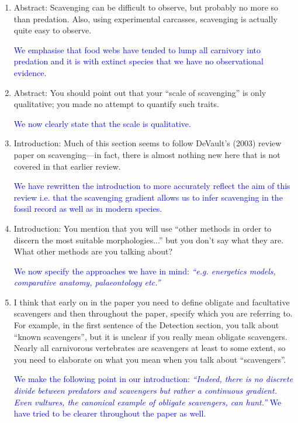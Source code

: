 \documentclass[12pt,letterpaper]{article}
\begin{document}
\begin{enumerate}
\item{Abstract: Scavenging can be difficult to observe, but probably no more so than predation.
Also, using experimental carcasses, scavenging is actually quite easy to observe.}

\textcolor{blue}{We emphasise that food webs have tended to lump all carnivory into predation and it is with extinct species that we have no observational evidence.} 

\item{Abstract: You should point out that your ``scale of scavenging'' is only qualitative; you made no attempt to quantify such traits.}

\textcolor{blue}{We now clearly state that the scale is qualitative.} 

\item{Introduction: Much of this section seems to follow DeVault's (2003) review paper on scavenging—in fact, there is almost nothing new here that is not covered in that earlier review.}

\textcolor{blue}{We have rewritten the introduction to more accurately reflect the aim of this review i.e. that the scavenging gradient allows us to infer scavenging in the fossil record as well as in modern species.} %

\item{Introduction: You mention that you will use ``other methods in order to discern the most suitable morphologies...''  but you don't say what they are. What other methods are you talking about?}

\textcolor{blue}{We now specify the approaches we have in mind:  \textit{``e.g. energetics models, comparative anatomy, palaeontology etc.'' }}

\item{I think that early on in the paper you need to define obligate and facultative scavengers and then throughout the paper, specify which you are referring to. For example, in the first sentence of the Detection section, you talk about ``known scavengers'', but it is unclear if you really mean obligate scavengers. Nearly all carnivorous vertebrates are scavengers at least to some extent, so you need to elaborate on what you mean when you talk about ``scavengers''.}

\textcolor{blue} {We make the following point in our introduction: \textit{``Indeed, there is no discrete divide between predators and scavengers but rather a continuous gradient. Even vultures, the canonical example of obligate scavengers, can hunt.''} We have tried to be clearer throughout the paper as well.}


\end{enumerate}
\end{document}
